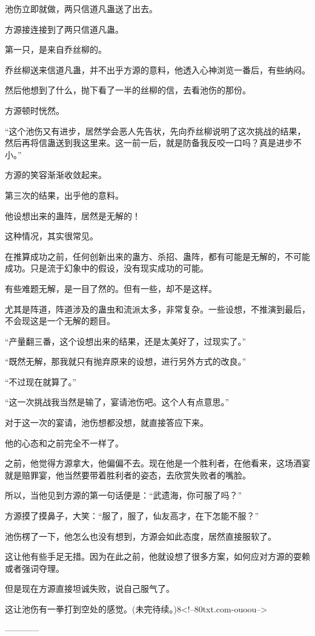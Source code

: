\begin{this_body}
池伤立即就做，两只信道凡蛊送了出去。

方源接连接到了两只信道凡蛊。

第一只，是来自乔丝柳的。

乔丝柳送来信道凡蛊，并不出乎方源的意料，他透入心神浏览一番后，有些纳闷。

然后他想到了什么，抛下看了一半的丝柳的信，去看池伤的那份。

方源顿时恍然。

“这个池伤又有进步，居然学会恶人先告状，先向乔丝柳说明了这次挑战的结果，然后再将信蛊送到我这里来。这一前一后，就是防备我反咬一口吗？真是进步不小。”

方源的笑容渐渐收敛起来。

第三次的结果，出乎他的意料。

他设想出来的蛊阵，居然是无解的！

这种情况，其实很常见。

在推算成功之前，任何创新出来的蛊方、杀招、蛊阵，都有可能是无解的，不可能成功。只是流于幻象中的假设，没有现实成功的可能。

有些难题无解，是一目了然的。但有一些，却不是这样。

尤其是阵道，阵道涉及的蛊虫和流派太多，非常复杂。一些设想，不推演到最后，不会现这是一个无解的题目。

“产量翻三番，这个设想出来的结果，还是太美好了，过现实了。”

“既然无解，那我就只有抛弃原来的设想，进行另外方式的改良。”

“不过现在就算了。”

“这一次挑战我当然是输了，宴请池伤吧。这个人有点意思。”

对于这一次的宴请，池伤想都没想，就直接答应下来。

他的心态和之前完全不一样了。

之前，他觉得方源拿大，他偏偏不去。现在他是一个胜利者，在他看来，这场酒宴就是赔罪宴，他当然要带着胜利者的姿态，去欣赏失败者的嘴脸。

所以，当他见到方源的第一句话便是：“武遗海，你可服了吗？”

方源摸了摸鼻子，大笑：“服了，服了，仙友高才，在下怎能不服？”

池伤楞了一下，他怎么也没有想到，方源会如此态度，居然直接服软了。

这让他有些手足无措。因为在此之前，他就设想了很多方案，如何应对方源的耍赖或者强词夺理。

但是现在方源直接坦诚失败，说自己服气了。

这让池伤有一拳打到空处的感觉。(未完待续。)8<!--80txt.com-ouoou-->

------------

\end{this_body}

